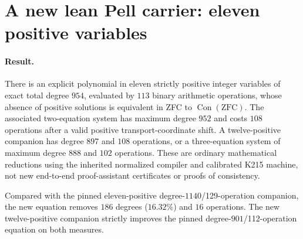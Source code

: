 \section{A new lean Pell carrier: eleven positive variables}
\label{sec:positive-lean}

\paragraph{Result.}
There is an explicit polynomial in eleven strictly positive integer variables
of exact total degree $954$, evaluated by $113$ binary arithmetic operations,
whose absence of positive solutions is equivalent in ZFC to $\operatorname{Con}(\mathrm{ZFC})$.
The associated two-equation system has maximum degree $952$ and costs $108$
operations after a valid positive transport-coordinate shift. A twelve-positive
companion has degree $897$ and $108$ operations, or a three-equation system of
maximum degree $888$ and $102$ operations. These are ordinary mathematical
reductions using the inherited normalized compiler and calibrated K215 machine,
not new end-to-end proof-assistant certificates or proofs of consistency.

Compared with the pinned eleven-positive degree-$1140$/129-operation companion,
the new equation removes $186$ degrees ($16.32\%$) and $16$ operations.
The new twelve-positive companion strictly improves the pinned
degree-$901$/112-operation equation on both measures.

